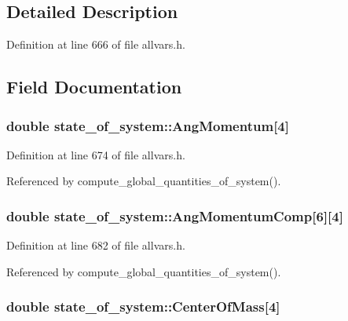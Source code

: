 \subsection{Detailed Description}


Definition at line 666 of file allvars.h.



\subsection{Field Documentation}
\hypertarget{structstate__of__system_a47635bc3c684637fff0c078223ae59fc}{
\subsubsection[{AngMomentum}]{\setlength{\rightskip}{0pt plus 5cm}double {\bf state\_\-of\_\-system::AngMomentum}\mbox{[}4\mbox{]}}}
\label{structstate__of__system_a47635bc3c684637fff0c078223ae59fc}


Definition at line 674 of file allvars.h.



Referenced by compute\_\-global\_\-quantities\_\-of\_\-system().

\hypertarget{structstate__of__system_a384a907f66c243418fbd02c317154c72}{
\subsubsection[{AngMomentumComp}]{\setlength{\rightskip}{0pt plus 5cm}double {\bf state\_\-of\_\-system::AngMomentumComp}\mbox{[}6\mbox{]}\mbox{[}4\mbox{]}}}
\label{structstate__of__system_a384a907f66c243418fbd02c317154c72}


Definition at line 682 of file allvars.h.



Referenced by compute\_\-global\_\-quantities\_\-of\_\-system().

\hypertarget{structstate__of__system_abdfe2ff074685ef9fdc4043beb898e98}{
\subsubsection[{CenterOfMass}]{\setlength{\rightskip}{0pt plus 5cm}double {\bf state\_\-of\_\-system::CenterOfMass}\mbox{[}4\mbox{]}}}
\label{structstate__of__system_abdfe2ff074685ef9fdc4043beb898e98}


